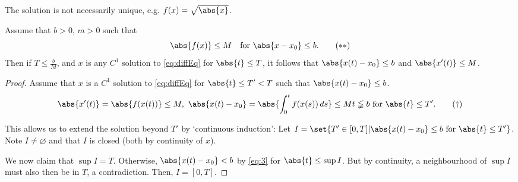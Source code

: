 \documentclass{article}
\renewcommand{\emptyset}{\varnothing}
\begin{document}

\begin{remark}
    The solution is not necessarily unique, e.g. $f(x) = \sqrt{\abs{x}}$.
\end{remark}

\begin{lemma}
    Assume that $b > 0$, $m > 0$ such that
    \begin{equation*}
        \abs{f(x)} \leq M \quad \text{for } \abs{x - x_0} \leq b. \tag{$**$} \label{eq:2}
    \end{equation*}
    Then if $T \leq \frac{b}{M}$, and $x$ is any $C^1$ solution to \eqref{eq:diffEq} for $\abs{t} \leq T$, it follows that $\abs{x(t) - x_0} \leq b$ and $\abs{x'(t)} \leq M$.
\end{lemma}

\begin{proof}
    Assume that $x$ is a $C^1$ solution to \eqref{eq:diffEq} for $\abs{t} \leq T' < T$ such that $\abs{x(t) - x_0} \leq b$.
    \begin{equation*}
        \abs{x'(t)} = \abs{f(x(t))} \leq M, \ \abs{x(t) - x_0} = \abs{\int_0^t f(x(s)) \, ds} \leq Mt \lneqq b \text{ for } \abs{t} \leq T'. \tag{$\dagger$} \label{eq:3}
    \end{equation*}

    This allows us to extend the solution beyond $T'$ by `continuous induction':
    Let $I = \set{T' \in [0, T] | \abs{x(t) - x_0} \leq b \text{ for } \abs{t} \leq T'}$. Note $I \neq \emptyset$ and that $I$ is closed (both by continuity of $x$).

    We now claim that $\sup I = T$.
    Otherwise, $\abs{x(t) - x_0} < b$ by \eqref{eq:3} for $\abs{t} \leq \sup I$.
    But by continuity, a neighbourhood of $\sup I$ must also then be in $T$, a contradiction.
    Then, $I = [0, T]$.
\end{proof}
\end{document}
